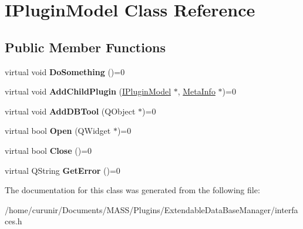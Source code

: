 \hypertarget{class_i_plugin_model}{}\section{I\+Plugin\+Model Class Reference}
\label{class_i_plugin_model}
\subsection*{Public Member Functions}
\begin{DoxyCompactItemize}
\item 
virtual void {\bfseries Do\+Something} ()=0\hypertarget{class_i_plugin_model_a377627e683f892ffda2c6225d975251b}{}\label{class_i_plugin_model_a377627e683f892ffda2c6225d975251b}

\item 
virtual void {\bfseries Add\+Child\+Plugin} (\hyperlink{class_i_plugin_model}{I\+Plugin\+Model} $\ast$, \hyperlink{struct_meta_info}{Meta\+Info} $\ast$)=0\hypertarget{class_i_plugin_model_aff406b0571f6dc77488c315e0df0f563}{}\label{class_i_plugin_model_aff406b0571f6dc77488c315e0df0f563}

\item 
virtual void {\bfseries Add\+D\+B\+Tool} (Q\+Object $\ast$)=0\hypertarget{class_i_plugin_model_a2db1262756c4a587fd6cd2d7191841fb}{}\label{class_i_plugin_model_a2db1262756c4a587fd6cd2d7191841fb}

\item 
virtual bool {\bfseries Open} (Q\+Widget $\ast$)=0\hypertarget{class_i_plugin_model_ac1c51202f69db707ca56e8f3c78ce163}{}\label{class_i_plugin_model_ac1c51202f69db707ca56e8f3c78ce163}

\item 
virtual bool {\bfseries Close} ()=0\hypertarget{class_i_plugin_model_a3f9ce2298f73283fec68fc908db14e57}{}\label{class_i_plugin_model_a3f9ce2298f73283fec68fc908db14e57}

\item 
virtual Q\+String {\bfseries Get\+Error} ()=0\hypertarget{class_i_plugin_model_ad42778c15ce3e8fdb9524a6dfd61792a}{}\label{class_i_plugin_model_ad42778c15ce3e8fdb9524a6dfd61792a}

\end{DoxyCompactItemize}


The documentation for this class was generated from the following file\+:\begin{DoxyCompactItemize}
\item 
/home/curunir/\+Documents/\+M\+A\+S\+S/\+Plugins/\+Extendable\+Data\+Base\+Manager/interfaces.\+h\end{DoxyCompactItemize}
